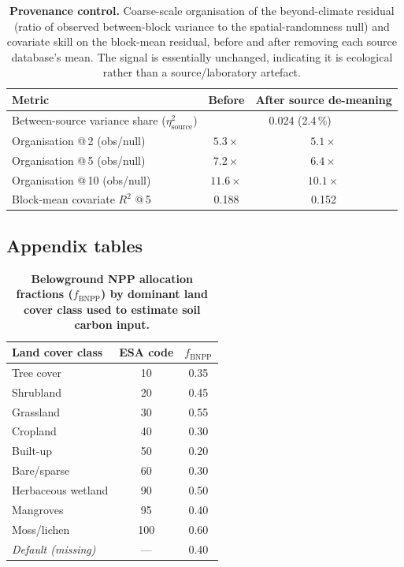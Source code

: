 \documentclass[12pt, a4paper]{article}
\begin{document}
\begin{table}[h!]
  \centering
  \small
  \caption{%
    \textbf{Provenance control.} Coarse-scale organisation of the
    beyond-climate residual (ratio of observed between-block variance to the
    spatial-randomness null) and covariate skill on the block-mean residual,
    before and after removing each source database's mean. The signal is
    essentially unchanged, indicating it is ecological rather than a
    source/laboratory artefact.}
  \label{tab:provenance}
  \begin{tabular}{lcc}
    \toprule
    Metric & Before & After source de-meaning \\
    \midrule
    Between-source variance share ($\eta^2_\text{source}$) & \multicolumn{2}{c}{0.024 (2.4\,\%)} \\
    Organisation @\,2\textdegree{} (obs/null)   & $5.3\times$  & $5.1\times$ \\
    Organisation @\,5\textdegree{} (obs/null)   & $7.2\times$  & $6.4\times$ \\
    Organisation @\,10\textdegree{} (obs/null)  & $11.6\times$ & $10.1\times$ \\
    Block-mean covariate $R^2$ @\,5\textdegree{} & 0.188 & 0.152 \\
    \bottomrule
  \end{tabular}
\end{table}


\subsection*{Appendix tables}

\begin{table}[h!]
  \centering
  \small
  \caption{%
    \textbf{Belowground NPP allocation fractions ($f_\text{BNPP}$) by
    dominant land cover class used to estimate soil carbon input.}
  }
  \label{tab:allocation}
  \begin{tabular}{lcc}
    \toprule
    Land cover class & ESA code & $f_\text{BNPP}$ \\
    \midrule
    Tree cover            & 10  & 0.35 \\
    Shrubland             & 20  & 0.45 \\
    Grassland             & 30  & 0.55 \\
    Cropland              & 40  & 0.30 \\
    Built-up              & 50  & 0.20 \\
    Bare/sparse           & 60  & 0.30 \\
    Herbaceous wetland    & 90  & 0.50 \\
    Mangroves             & 95  & 0.40 \\
    Moss/lichen           & 100 & 0.60 \\
    \midrule
    \textit{Default (missing)}  & --- & 0.40 \\
    \bottomrule
  \end{tabular}
\end{table}
\end{document}
